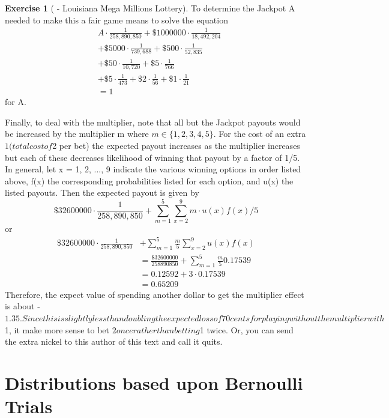 \documentclass[10pt,]{book}
\theoremstyle{plain}
\theoremstyle{definition}
\theoremstyle{definition}
\theoremstyle{definition}
\newtheorem{exercise}[theorem]{Exercise}
\numberwithin{equation}{section}
\begin{document}
\begin{exercise}[{ - Louisiana Mega Millions Lottery}]
To determine the Jackpot A needed to make this a fair game means to solve the equation
\begin{align*}
 & A \cdot \frac{1}{258,890,850} + \$1000000 \cdot \frac{1}{18,492,204} \\
 & + \$5000 \cdot \frac{1}{739,688} + \$500 \cdot \frac{1}{52,835}\\
 & + \$50 \cdot \frac{1}{10,720} + \$5 \cdot \frac{1}{766} \\
 & + \$5 \cdot \frac{1}{473} + \$2 \cdot \frac{1}{56} + \$1 \cdot \frac{1}{21}\\
 & = 1
\end{align*}
for A.
%
\par

Finally, to deal with the multiplier, note that all but the Jackpot payouts would be increased by the multiplier m where \(m \in \{1,2,3,4,5\}\).  For the cost of an extra $1 (total cost of $2 per bet) the expected payout increases as the multiplier increases but each of these decreases likelihood of winning that payout by a factor of 1/5.  In general, let x = 1, 2, ..., 9 indicate the various winning options in order listed above, f(x) the corresponding probabilities listed for each option, and  u(x) the listed payouts. Then the expected payout is given by
\begin{equation*} \$32600000 \cdot \frac{1}{258,890,850} + \sum_{m=1}^5
\sum_{x=2}^9 m \cdot u(x) f(x)/5 \end{equation*}
or
	\begin{align*}
 \$32600000 \cdot \frac{1}{258,890,850} & + \sum_{m=1}^5 \frac{m}{5} \sum_{x=2}^9 u(x) f(x) \\
 & = \frac{\$32600000}{258890850} + \sum_{m=1}^5 \frac{m}{5} 0.17539\\
 & = 0.12592 + 3 \cdot 0.17539\\
 & = 0.65209
\end{align*}
Therefore, the expect value of spending another dollar to get the multiplier effect is about -$1.35.  Since this is slightly less than doubling the expected loss of 70 cents for playing without the multiplier with $1, it make more sense to bet $2 once rather than betting $1 twice.  Or, you can send the extra nickel to this author of this text and call it quits.
%
\end{exercise}
\typeout{************************************************}
\typeout{************************************************}
\chapter[{Distributions based upon Bernoulli Trials}]{Distributions based upon Bernoulli Trials}\label{BinomialGeometricNegBinomial}
\typeout{************************************************}
\typeout{************************************************}
\end{document}
